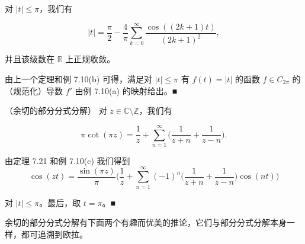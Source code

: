 \begin{example}

\begin{items}
\item

对 $ |t| \le \pi $，我们有

\[
|t| = \frac{\pi}{2} - \frac{4}{\pi}\sum_{k=0}^{\infty}\frac{\cos((2k+1)t)}{(2k+1)^{2}} ,
\]

并且该级数在 $ \mathbb{R} $ 上正规收敛。

\proofhead
由上一个定理和例 7.10(b) 可得，满足对 $ |t| \le \pi $ 有 $ f(t) = |t| $ 的函数 $ f \in C_{2\pi} $ 的（规范化）导数 $ f' $ 由例 7.10(a) 的映射给出。\nobreak\hspace{0.35em}■
\item

（余切的部分分式分解）  对 $ z \in \mathbb{C} \setminus \mathbb{Z} $，我们有

\begin{equation}
\pi\cot(\pi z) = \frac{1}{z} + \sum_{n=1}^{\infty}\Big(\frac{1}{z+n} + \frac{1}{z-n}\Big) .\tag{7.16}
\end{equation}

\proofhead
由定理 7.21 和例 7.10(c) 我们得到
\[
\cos(zt) = \frac{\sin(\pi z)}{\pi}\Big(\frac{1}{z} + \sum_{n=1}^{\infty}(-1)^{n}\Big(\frac{1}{z+n} + \frac{1}{z-n}\Big)\cos(nt)\Big)
\]

对 $ |t| \le \pi $。最后，取 $ t = \pi $。\nobreak\hspace{0.35em}■

\end{items}

余切的部分分式分解有下面两个有趣而优美的推论，它们与部分分式分解本身一样，都可追溯到欧拉。

\end{example}

